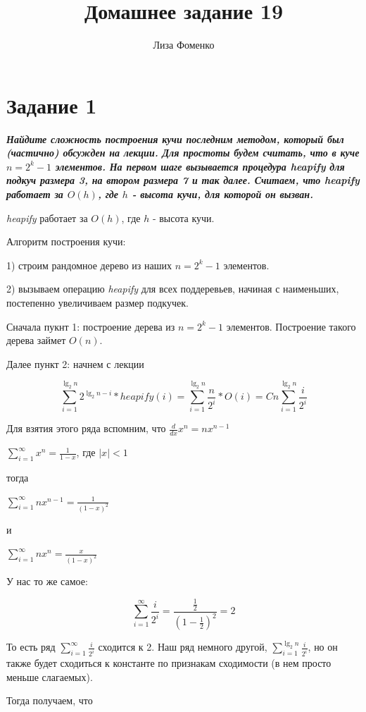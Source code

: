 \documentclass{article}
\title{Домашнее задание 19}
\author{Лиза Фоменко}
\date{}
\begin{document}
\maketitle


\section*{\textbf{Задание 1}} \textbf{\textit{Найдите сложность построения кучи последним методом, который был (частично) обсужден на лекции. Для простоты будем считать, что в куче $n = 2^k - 1$ элементов.
На первом шаге вызывается процедура {heapify} для подкуч размера 3, на втором размера 7 и так далее. Считаем, что {heapify} работает за $O(h)$, где $h$ - высота кучи, для которой он вызван.}}

\textit{heapify} работает за $O(h)$, где $h$ - высота кучи. 

Алгоритм построения кучи:

1) строим рандомное дерево из наших $n = 2^k - 1$ элементов.

2) вызываем операцию \textit{heapify} для всех поддеревьев, начиная с наименьших, постепенно увеличиваем размер подкучек.

Сначала пукнт 1: построение дерева из $n = 2^k - 1$ элементов. Построение такого дерева займет $O(n)$.

Далее пункт 2: начнем с лекции

$$\sum_{i = 1}^{\lg_2 n}  2^{\lg_2 n-i}* heapify(i) = \sum_{i = 1}^{\lg_2 n}  \frac{n}{2^i}*O(i) = Cn   \sum_{i = 1}^{\lg_2 n}  \frac{i}{2^i}$$

Для взятия этого ряда вспомним, что $\frac{d}{dx} x^{n} = nx^{n-1}$

$\sum_{i=1}^{\infty} x^{n} = \frac{1}{1-x}$, где $|x| < 1$

тогда

$\sum_{i=1}^{\infty} nx^{n-1} = \frac{1}{(1-x)^2}$

и

$\sum_{i=1}^{\infty} nx^{n} = \frac{x}{(1-x)^2}$

У нас то же самое:

$$\sum_{i = 1}^{\infty}  \frac{i}{2^i} = \frac{\frac{1}{2}}{(1-\frac{1}{2})^2} = 2$$

То есть ряд $\sum_{i = 1}^{\infty}  \frac{i}{2^i}$ сходится к 2. Наш ряд немного другой, $\sum_{i = 1}^{\lg_2 n}  \frac{i}{2^i}$, но он также будет сходиться к константе по признакам сходимости (в нем просто меньше слагаемых). 

Тогда получаем, что 
\end{document}
